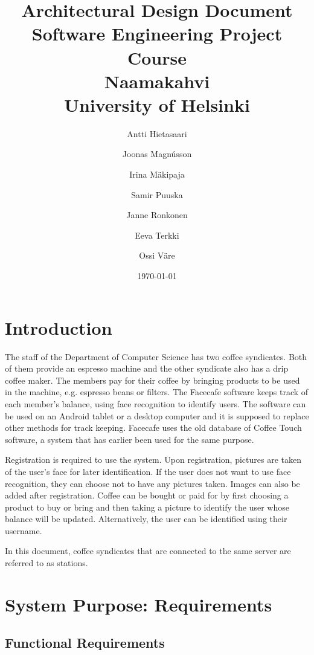 \documentclass[11pt]{article}
\title{Architectural Design Document\\
  Software Engineering Project Course\\
  Naamakahvi\\
  University of Helsinki}
\author{Antti Hietasaari
  \and Joonas Magnússon
  \and Irina Mäkipaja
  \and Samir Puuska
  \and Janne Ronkonen
  \and Eeva Terkki
  \and Ossi Väre}
\date{\today}
\begin{document}
\maketitle

\tableofcontents



\section{Introduction}

The staff of the Department of Computer Science has two coffee syndicates. 
Both of them provide an espresso machine and the other syndicate also has 
a drip coffee maker. The members pay for their coffee by bringing products 
to be used in the machine, e.g. espresso beans or filters. The Facecafe 
software keeps track of each member’s balance, using face recognition to 
identify users. The software can be used on an Android tablet
or a desktop computer and it is supposed to replace other methods for track 
keeping. Facecafe uses the old database of Coffee Touch software, a system 
that has earlier been used for the same purpose.

Registration is required to use the system. Upon registration, pictures are
taken of the user's face for later identification. If the user does not want
to use face recognition, they can choose not to have any pictures taken. 
Images can also be added after registration. Coffee can be bought or paid for 
by first choosing a product to buy or bring and then taking a picture to identify
the user whose balance will be updated. Alternatively, the user can be identified 
using their username. 

In this document, coffee syndicates that are connected to the same server are 
referred to as stations.
\section{System Purpose: Requirements}

\subsection{Functional Requirements}
\end{document}
